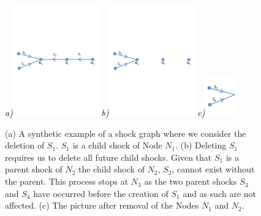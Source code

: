 \begin{appendices}
\begin{figure}[!ht]
\centering
{\footnotesize\textit{\textcolor{black}{a)}}}\includegraphics[width=0.33\textwidth]{figs/delete_shocks.pdf}
{\footnotesize\textit{\textcolor{black}{b)}}}\includegraphics[width=0.33\textwidth]{figs/delete_shocks_2.pdf}
{\footnotesize\textit{\textcolor{black}{c)}}}\includegraphics[width=0.12\textwidth]{figs/delete_shocks_3.pdf}
\caption{(a) A synthetic example of a shock graph where we consider the deletion of $S_1$. $S_1$ is a child shock of Node $N_1$. (b) Deleting $S_1$ requires us to delete all future child shocks. Given that $S_1$ is a parent shock of $N_2$ the child shock of $N_2$, $S_2$, cannot exist without the parent. This process stops at $N_3$ as the two parent shocks $S_3$ and $S_4$ have occurred before the creation of $S_1$ and as such are not affected. (c) The picture after removal of the Nodes $N_1$ and $N_2$. } 
\label{fig:delete_shocks}
\end{figure}




\end{appendices}
